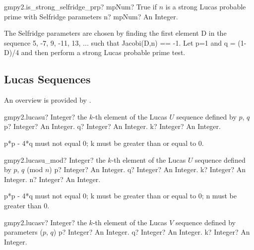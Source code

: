 \vspace{0.6cm}
\begin{mpFunctionsExtract}
	\mpFunctionOne
	{gmpy2.is\_strong\_selfridge\_prp? mpNum? True if $n$ is a strong Lucas probable prime with Selfridge parameters}
	{n? mpNum? An Integer.}
\end{mpFunctionsExtract}

\vspace{0.3cm}
The Selfridge parameters are chosen by finding the first element D in the sequence {5, -7, 9, -11, 13, ...} such that Jacobi(D,n) == -1. Let p=1 and q = (1-D)/4 and then perform a strong Lucas probable prime test.



\subsection{Lucas Sequences}

An overview is provided by \cite{Joye_1996}.

\vspace{0.6cm}
\begin{mpFunctionsExtract}
	\mpFunctionThree
	{gmpy2.lucasu? Integer? the $k$-th element of the Lucas $U$ sequence defined by $p$, $q$}
	{p? Integer? An Integer.}
	{q? Integer? An Integer.}
	{k? Integer? An Integer.}
\end{mpFunctionsExtract}

\vspace{0.3cm}
p*p - 4*q must not equal 0; k must be greater than or equal to 0.




\vspace{0.6cm}
\begin{mpFunctionsExtract}
	\mpFunctionFour
	{gmpy2.lucasu\_mod? Integer? the $k$-th element of the Lucas $U$ sequence defined by $p$, $q$ (mod $n$)}
	{p? Integer? An Integer.}
	{q? Integer? An Integer.}
	{k? Integer? An Integer.}
	{n? Integer? An Integer.}
\end{mpFunctionsExtract}

\vspace{0.3cm}
p*p - 4*q must not equal 0; k must be greater than or equal to 0; n must be greater than 0.


\vspace{0.6cm}
\begin{mpFunctionsExtract}
	\mpFunctionThree
	{gmpy2.lucasv? Integer? the $k$-th element of the Lucas $V$ sequence defined by parameters ($p$, $q$)}
	{p? Integer? An Integer.}
	{q? Integer? An Integer.}
	{k? Integer? An Integer.}
\end{mpFunctionsExtract}

